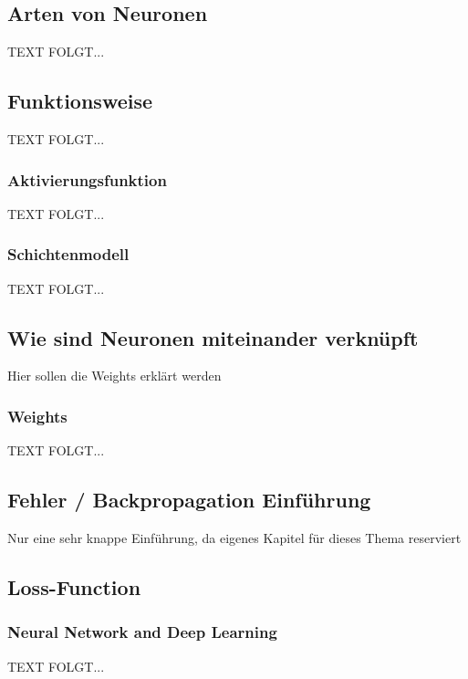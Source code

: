  \subsection{Arten von Neuronen}\label{arten_von_neuronen}
  TEXT FOLGT... 


\newpage
\subsection{Funktionsweise}\label{Funktionsweise}
  TEXT FOLGT... 
 

\newpage
\subsubsection{Aktivierungsfunktion}\label{Aktivierungsfunktion}
  TEXT FOLGT... 


\newpage
\subsubsection{Schichtenmodell}\label{Schichtenmodell}
  TEXT FOLGT... 

\newpage 
\subsection{Wie sind Neuronen miteinander verknüpft}\label{kap_verknuepfung_neuronen}  
%
Hier sollen die Weights erklärt werden

\subsubsection{Weights}\label{Weights}
  TEXT FOLGT... 

\subsection{Fehler / Backpropagation Einführung}\label{kap_fehler_backpropagation}
Nur eine sehr knappe Einführung, da eigenes Kapitel für dieses Thema reserviert


\subsection{Loss-Function}

\subsubsection{Neural Network and Deep Learning}\label{NN_deeplearning}
  TEXT FOLGT... 